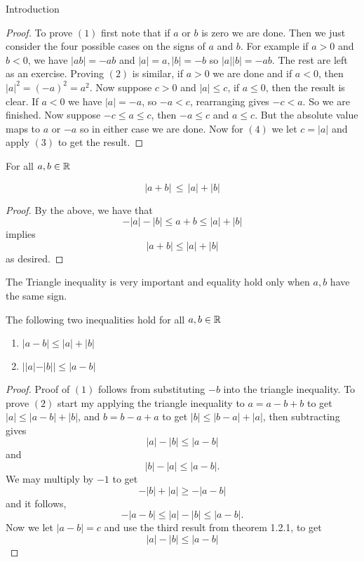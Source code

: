\begin{chapter}{Introduction}
    
    \begin{proof}
        To prove $(1)$ first note that if $a$ or $b$ is zero we are done. Then we just consider the four possible cases on the signs of $a$ and $b$. For example if $a > 0$ and $b < 0$, 
        we have $|ab| = -ab$ and $|a| = a, |b| = -b$ so $|a||b| = -ab$. The rest are left as an exercise. 
        Proving $(2)$ is similar, if $a > 0$ we are done and if $a < 0$, then $|a|^2 = (-a)^2 = a^2$. 
        Now suppose $c > 0$ and $|a| \leq c$, if $a \leq 0$, then the result is clear. If $a < 0$ we have $|a| = -a$, so 
        $-a < c$, rearranging gives $-c < a$. So we are finished. Now suppose $-c \leq a \leq c$, then $-a \leq c$ and $a \leq c$. But the absolute value maps to 
        $a$ or $-a$ so in either case we are done. 
        Now for $(4)$ we let $c = |a|$ and apply $(3)$ to get the result. 
    \end{proof}

    
    \begin{thm}
        For all $a, b \in \mathbb{R}$ 
        
        \begin{equation}
            |a + b| \, \leq \, |a| + |b|
        \end{equation}
    \end{thm}

    
    \begin{proof}
        By the above, we have that
        \[-|a| -|b| \leq a + b \leq |a| + |b| \] 
        implies 
        \[|a + b| \leq |a| + |b|\]
        as desired. 
    \end{proof}

    The Triangle inequality is very important and equality hold only when $a, b$ have the same sign. 

    
    
    \begin{thm}
        The following two inequalities hold for all $a, b \in \mathbb{R}$
        
        \begin{enumerate}
            \item $|a - b| \leq |a| + |b|$
            \item $||a| -|b|| \leq |a - b|$
        \end{enumerate}
    \end{thm}

    
    \begin{proof}
        Proof of $(1)$ follows from substituting $-b$ into the triangle inequality. 
        To prove $(2)$ start my applying the triangle inequality to $a = a - b + b$ to get 
        $|a| \leq |a - b| + |b| $, and $b = b - a + a$ to get $|b| \leq |b-a| + |a|$,
        then subtracting gives 
        \[|a| - |b| \leq |a - b| \] 
        and 
        \[|b| - |a| \leq |a - b|.\]
        We may multiply by $-1$ to get 
        \[-|b| + |a| \geq -|a-b|\] 
        and it follows, 
        \[-|a-b| \leq |a| - |b| \leq |a - b|.\]
        Now we let $|a - b| = c$ and use the third result from theorem 1.2.1, to get 
        \[|a|- |b| \leq |a - b|\]


\end{proof}
\end{chapter}
